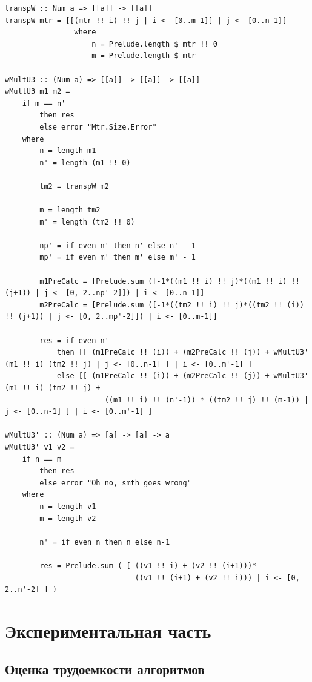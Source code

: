 \documentclass[12pt]{report}
\begin{document}
\begin{lstlisting}[label=some-code,caption=Алгоритм Винограда модификация 3]
transpW :: Num a => [[a]] -> [[a]]
transpW mtr = [[(mtr !! i) !! j | i <- [0..m-1]] | j <- [0..n-1]]
                where                 
                    n = Prelude.length $ mtr !! 0
                    m = Prelude.length $ mtr
    
wMultU3 :: (Num a) => [[a]] -> [[a]] -> [[a]]
wMultU3 m1 m2 = 
    if m == n'
        then res 
        else error "Mtr.Size.Error"
    where
        n = length m1
        n' = length (m1 !! 0)

        tm2 = transpW m2
    
        m = length tm2
        m' = length (tm2 !! 0)
    
        np' = if even n' then n' else n' - 1
        mp' = if even m' then m' else m' - 1
    
        m1PreCalc = [Prelude.sum ([-1*((m1 !! i) !! j)*((m1 !! i) !! (j+1)) | j <- [0, 2..np'-2]]) | i <- [0..n-1]]
        m2PreCalc = [Prelude.sum ([-1*((tm2 !! i) !! j)*((tm2 !! (i)) !! (j+1)) | j <- [0, 2..mp'-2]]) | i <- [0..m-1]]

        res = if even n'
            then [[ (m1PreCalc !! (i)) + (m2PreCalc !! (j)) + wMultU3' (m1 !! i) (tm2 !! j) | j <- [0..n-1] ] | i <- [0..m'-1] ]
            else [[ (m1PreCalc !! (i)) + (m2PreCalc !! (j)) + wMultU3' (m1 !! i) (tm2 !! j) + 
                       ((m1 !! i) !! (n'-1)) * ((tm2 !! j) !! (m-1)) | j <- [0..n-1] ] | i <- [0..m'-1] ]
    
wMultU3' :: (Num a) => [a] -> [a] -> a
wMultU3' v1 v2 = 
    if n == m
        then res
        else error "Oh no, smth goes wrong"
    where
        n = length v1
        m = length v2
    
        n' = if even n then n else n-1
    
        res = Prelude.sum ( [ ((v1 !! i) + (v2 !! (i+1)))*
                              ((v1 !! (i+1) + (v2 !! i))) | i <- [0, 2..n'-2] ] )
\end{lstlisting}


\chapter{Экспериментальная часть}
\section{Оценка трудоемкости алгоритмов}
\end{document}
